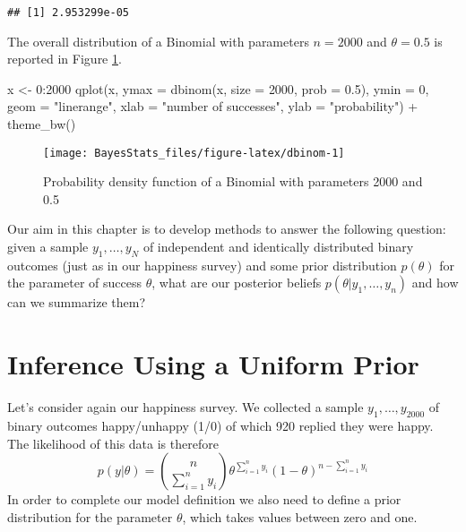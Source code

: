 \documentclass[
]{book}
\newenvironment{Shaded}{\begin{snugshade}}{\end{snugshade}}
\newcommand{\AttributeTok}[1]{\textcolor[rgb]{0.77,0.63,0.00}{#1}}
\newcommand{\DecValTok}[1]{\textcolor[rgb]{0.00,0.00,0.81}{#1}}
\newcommand{\FloatTok}[1]{\textcolor[rgb]{0.00,0.00,0.81}{#1}}
\newcommand{\FunctionTok}[1]{\textcolor[rgb]{0.00,0.00,0.00}{#1}}
\newcommand{\NormalTok}[1]{#1}
\newcommand{\OtherTok}[1]{\textcolor[rgb]{0.56,0.35,0.01}{#1}}
\newcommand{\SpecialCharTok}[1]{\textcolor[rgb]{0.00,0.00,0.00}{#1}}
\newcommand{\StringTok}[1]{\textcolor[rgb]{0.31,0.60,0.02}{#1}}
\begin{document}
\begin{verbatim}
## [1] 2.953299e-05
\end{verbatim}

The overall distribution of a Binomial with parameters \(n=2000\) and \(\theta = 0.5\) is reported in Figure \ref{fig:dbinom}.

\begin{Shaded}
\begin{Highlighting}[]
\NormalTok{x }\OtherTok{\textless{}{-}} \DecValTok{0}\SpecialCharTok{:}\DecValTok{2000}
\FunctionTok{qplot}\NormalTok{(x, }\AttributeTok{ymax =} \FunctionTok{dbinom}\NormalTok{(x, }\AttributeTok{size =} \DecValTok{2000}\NormalTok{, }\AttributeTok{prob =} \FloatTok{0.5}\NormalTok{), }\AttributeTok{ymin =} \DecValTok{0}\NormalTok{, }
      \AttributeTok{geom =} \StringTok{"linerange"}\NormalTok{,  }\AttributeTok{xlab =} \StringTok{"number of successes"}\NormalTok{, }\AttributeTok{ylab =} \StringTok{"probability"}\NormalTok{) }\SpecialCharTok{+}
  \FunctionTok{theme\_bw}\NormalTok{()}
\end{Highlighting}
\end{Shaded}

\begin{figure}

{\centering \texttt{[image: BayesStats\_files/figure-latex/dbinom-1]} 

}

\caption{Probability density function of a Binomial with parameters 2000 and 0.5}\label{fig:dbinom}
\end{figure}

Our aim in this chapter is to develop methods to answer the following question: given a sample \(y_1,\dots,y_N\) of independent and identically distributed binary outcomes (just as in our happiness survey) and some prior distribution \(p(\theta)\) for the parameter of success \(\theta\), what are our posterior beliefs \(p(\theta|y_1,\dots,y_n)\) and how can we summarize them?

\hypertarget{inference-using-a-uniform-prior}{%
\section{Inference Using a Uniform Prior}\label{inference-using-a-uniform-prior}}

Let's consider again our happiness survey. We collected a sample \(y_1,\dots,y_{2000}\) of binary outcomes happy/unhappy (1/0) of which 920 replied they were happy. The likelihood of this data is therefore
\[
p(y|\theta)=\binom{n}{\sum_{i=1}^ny_i}\theta^{\sum_{i=1}^ny_i}(1-\theta)^{n-\sum_{i=1}^ny_i}
\]
In order to complete our model definition we also need to define a prior distribution for the parameter \(\theta\), which takes values between zero and one.
\end{document}
